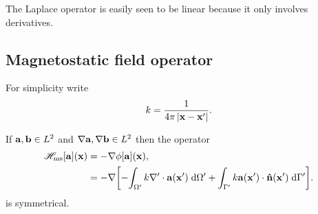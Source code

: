 The Laplace operator is easily seen to be linear because it only involves derivatives.


\subsection{Magnetostatic field operator}

For simplicity write
\begin{equation}
  \knl = \frac{1}{4\pi \abs{\xv - \xv'}}.
\end{equation}

\begin{theorem}
  If $\av, \bv \in \ltwo$ and $\grad \av, \grad\bv \in \ltwo$ then the operator
  \begin{equation}
    \begin{aligned}
      \hmsop [\av](\xv) &= - \grad \phim[\av](\xv), \\
      &= -\grad \bigs{
              -\intd[\magd']{ \knl \nabla' \cdot \av(\xv') }
              + \intd[\boundd']{\knl \av(\xv') \cdot \nv(\xv') }
            }.
    \end{aligned}
  \end{equation}
  is symmetrical.
\end{theorem}

